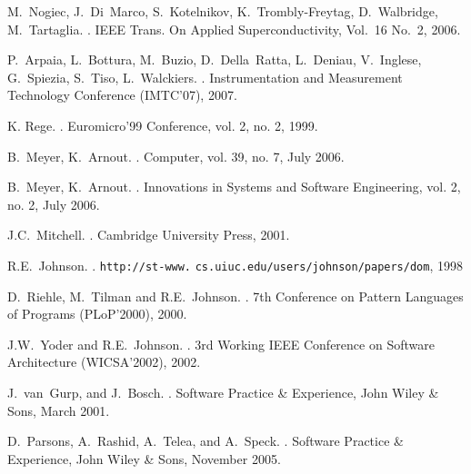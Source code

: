 \documentclass[preprint,10pt]{sigplanconf}
\begin{document}
\begin{thebibliography}{10}
M.~Nogiec, J.~Di~Marco, S.~Kotelnikov, K.~Trombly-Freytag, D.~Walbridge, M.~Tartaglia.
.
\newblock IEEE Trans. On Applied Superconductivity, Vol.~16 No.~2, 2006.

P.~Arpaia, L.~Bottura, M.~Buzio, D.~Della~Ratta, L.~Deniau, V.~Inglese, G.~Spiezia, S.~Tiso, L.~Walckiers.
.
\newblock Instrumentation and Measurement Technology Conference (IMTC'07), 2007.









K. Rege.
.
\newblock Euromicro'99 Conference, vol. 2, no. 2, 1999.

B.~Meyer, K.~Arnout.
.
\newblock Computer, vol. 39, no. 7, July 2006.

B.~Meyer, K.~Arnout.
.
\newblock Innovations in Systems and Software Enginee\-ring, vol. 2, no. 2, July 2006.

J.C.~Mitchell.
.
\newblock Cambridge University Press, 2001.



R.E.~Johnson.
.
\newblock \verb!http://st-www.! \verb!cs.uiuc.edu/users/johnson/papers/dom!, 1998

D.~Riehle, M.~Tilman and R.E.~Johnson.
.
\newblock 7th Conference on Pattern Languages of Programs (PLoP'2000), 2000.

J.W.~Yoder and R.E.~Johnson.
.
\newblock 3rd Working IEEE Conference on Software Architecture (WICSA'2002), 2002.

J.~van~Gurp, and J.~Bosch.
.
\newblock Software Practice \& Experience, John Wiley \& Sons, March 2001.

D.~Parsons, A.~Rashid, A.~Telea, and A.~Speck.
.
\newblock Software Practice \& Experience, John Wiley \& Sons, November 2005.


\end{thebibliography}
\end{document}
